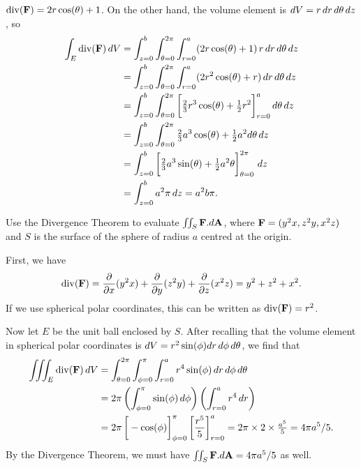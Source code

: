 \documentclass[a4paper]{amsart}
\renewenvironment{solution}{\SolutionInline}{\endSolutionInline}
\begin{document}
\begin{solution}
\begin{itemize}
   $\operatorname{div}(\mathbf{F})=2r\cos(\theta)+1$.  On the other hand, the volume element
   is $dV=r\,dr\,d\theta\,dz$, so 
   \begin{align*}
    \int_E\dv(\vF)\,dV 
     &= \int_{z=0}^b\int_{\azi=0}^{2\pi}\int_{r=0}^a
          (2r\cos(\azi)+1)\,r\,dr\,d\azi\,dz \\
     &= \int_{z=0}^b\int_{\azi=0}^{2\pi}\int_{r=0}^a
          (2r^2\cos(\azi)+r)\,dr\,d\azi\,dz \\
     &= \int_{z=0}^b\int_{\azi=0}^{2\pi}
         \CH{\tfrac{2}{3}r^3\cos(\azi)+\half r^2}_{r=0}^a
          d\azi\,dz \\
     &= \int_{z=0}^b\int_{\azi=0}^{2\pi}
         \tfrac{2}{3}a^3\cos(\azi)+\half a^2
          d\azi\,dz \\
     &= \int_{z=0}^b
         \CH{\tfrac{2}{3}a^3\sin(\azi)+\half a^2\azi}_{\azi=0}^{2\pi}
        \,dz \\
     &= \int_{z=0}^b a^2\pi \, dz = a^2b\pi.
   \end{align*}
 \end{itemize}
\end{solution}

\begin{exercise}
 Use the Divergence Theorem to evaluate $\iint_S\mathbf{F}.d\mathbf{A}$, where
 $\mathbf{F}=(y^2x,z^2y,x^2z)$ and $S$ is the surface of the sphere of radius
 $a$ centred at the origin.
\end{exercise}
\begin{solution}
 First, we have
 \[ \operatorname{div}(\mathbf{F}) = \frac{\partial}{\partial x}(y^2x)+\frac{\partial}{\partial y}(z^2y)+\frac{\partial}{\partial z}(x^2z) 
     = y^2+z^2+x^2.
 \]
 If we use spherical polar coordinates, this can be written as $\operatorname{div}(\mathbf{F})=r^2$.

 Now let $E$ be the unit ball enclosed by $S$.  After recalling that the
 volume element in spherical polar coordinates is
 $dV=r^2\sin(\phi)dr\,d\phi\,d\theta$, we find that
 \begin{align*}
  \iiint_E\dv(\vF)\,dV 
   &= \int_{\azi=0}^{2\pi}\int_{\zen=0}^\pi\int_{r=0}^a 
        r^4\sin(\zen)\,dr\,d\zen\,d\azi \\
   &= 2\pi \left(\int_{\zen=0}^\pi\sin(\zen)\,d\zen\right)
           \left(\int_{r=0}^a r^4\,dr\right) \\
   &= 2\pi\CH{-\cos(\zen)}_{\zen=0}^\pi\CH{\frac{r^5}{5}}_{r=0}^a
    = 2\pi\tm 2\tm \tfrac{a^5}{5} = 4\pi a^5/5.
 \end{align*}
 By the Divergence Theorem, we must have $\iint_S\mathbf{F}.d\mathbf{A}=4\pi a^5/5$ as well.
\end{solution}
\end{document}
